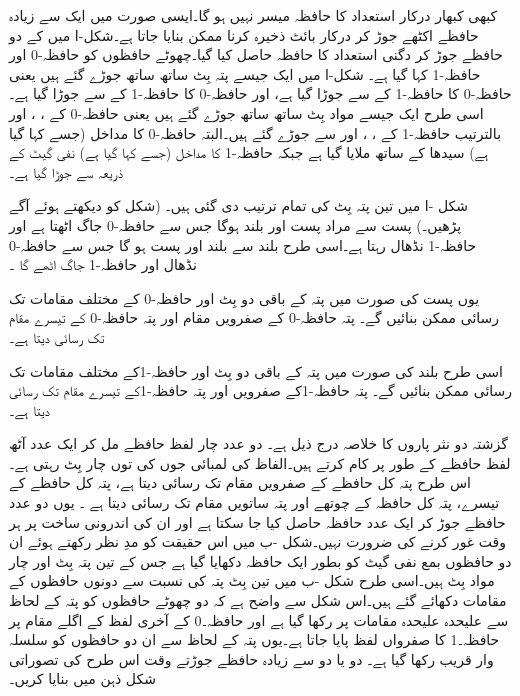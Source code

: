 کبھی کبھار درکار استعداد کا حافظہ میسر نہیں ہو گا۔ایسی صورت میں  ایک سے زیادہ حافظے اکٹھے جوڑ کر درکار بائٹ ذخیرہ کرنا ممکن بنایا جاتا ہے۔شکل-ا میں      کے دو حافظے جوڑ کر دگنی استعداد کا   حافظہ حاصل کیا گیا۔چھوٹے حافظوں کو حافظہ-0 اور حافظہ-1 کہا گیا ہے۔ شکل-ا  میں ایک جیسے  پتہ بِٹ ساتھ ساتھ  جوڑے گئے ہیں یعنی حافظہ-0 کا   حافظہ-1 کے   سے جوڑا گیا ہے، اور  حافظہ-0 کا   حافظہ-1 کے   سے جوڑا گیا ہے۔اسی طرح  ایک جیسے  مواد بِٹ   ساتھ  ساتھ جوڑے گئے ہیں یعنی حافظہ-0 کے ، ،   اور   بالترتیب حافظہ-1 کے ، ،   اور   سے جوڑے گئے ہیں۔البتہ حافظہ-0 کا  مداخل (جسے  کہا گیا ہے)   سیدھا  کے ساتھ ملایا گیا ہے جبکہ  حافظہ-1 کا  مداخل (جسے  کہا گیا ہے) نفی گیٹ کے ذریعہ   سے جوڑا گیا ہے۔



شکل -ا میں تین  پتہ  بِٹ کی تمام ترتیب  دی  گئی ہیں۔ (شکل   کو دیکھتے ہوئے آگے پڑھیں۔) پست   سے مراد  پست     اور بلند  ہوگا جس سے حافظہ-0  جاگ  اٹھتا ہے  اور حافظہ-1 نڈھال  رہتا ہے۔اسی طرح بلند   سے   بلند اور  پست ہو گا  جس سے حافظہ-0  نڈھال   اور حافظہ-1 جاگ اٹھے گا  ۔

یوں  پست    کی صورت میں  پتہ کے  باقی دو بِٹ   اور  حافظہ-0 کے مختلف مقامات تک رسائی ممکن بنائیں گے۔ پتہ   حافظہ-0 کے صفرویں  مقام اور  پتہ   حافظہ-0 کے تیسرے مقام تک رسائی دیتا ہے۔



اسی طرح  بلند    کی صورت میں  پتہ کے  باقی دو بِٹ   اور  حافظہ-1کے مختلف مقامات تک رسائی ممکن بنائیں گے۔ پتہ   حافظہ-1کے صفرویں   اور  پتہ   حافظہ-1کے تیسرے مقام تک رسائی دیتا ہے۔


گزشتہ دو   نثر پاروں  کا خلاصہ درج ذیل ہے۔ دو عدد چار  لفظ حافظے مل کر ایک عدد آٹھ  لفظ  حافظے کے طور  پر کام کرتے ہیں۔الفاظ کی لمبائی جوں کی توں چار بِٹ  رہتی ہے۔اس طرح  پتہ   کل حافظے کے صفرویں مقام تک رسائی دیتا ہے، پتہ   کل حافظے کے تیسرے، پتہ   کل حافظہ کے چوتھے  اور پتہ    ساتویں مقام تک رسائی دیتا ہے ۔ یوں دو عدد حافظے جوڑ کر ایک عدد حافظہ حاصل کیا جا سکتا ہے اور ان کی اندرونی ساخت پر ہر وقت غور کرنے کی ضرورت نہیں۔شکل -ب  میں اس حقیقت کو مدِ نظر رکھتے ہوئے ان دو حافظوں بمع نفی گیٹ کو بطور ایک   حافظہ دکھایا گیا ہے جس کے تین پتہ  بِٹ اور چار مواد  بِٹ ہیں۔اسی طرح  شکل -ب  میں تین بِٹ پتہ کی نسبت سے دونوں حافظوں کے مقامات دکھائے گئے ہیں۔اس شکل سے واضح ہے کہ دو چھوٹے حافظوں کو پتہ کے لحاظ سے علیحدہ علیحدہ مقامات پر رکھا گیا ہے اور حافظہ۔0 کے آخری لفظ کے اگلے مقام پر حافظہ۔1 کا صفرواں لفظ پایا جاتا ہے۔یوں پتہ کے لحاظ سے ان دو  حافظوں کو سلسلہ وار قریب رکھا گیا ہے۔ دو یا دو سے زیادہ حافظے جوڑتے وقت اس طرح کی تصوراتی شکل ذہن میں بنایا کریں۔
	
